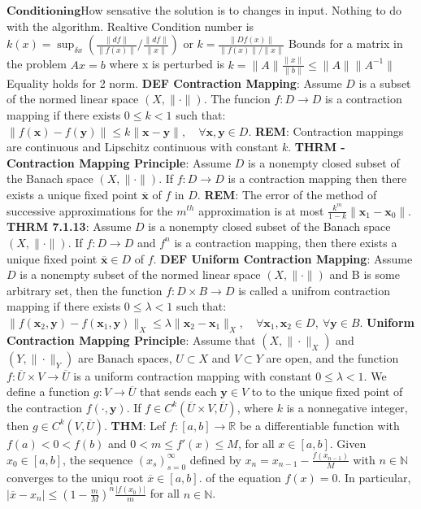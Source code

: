 \documentclass[8pt]{extarticle}
\theoremstyle{definition}
\begin{document}
$\mathbf{Conditioning}$How sensative the solution is to changes in input. Nothing to do with the algorithm.
Realtive Condition number is $k(x) = \sup_{\delta x}(\frac{\|df\|}{\|f(x)\|} \big/ \frac{\|df\|}{\|x\|})$ or $k = \frac{\|Df(x)\|}{\|f(x)\|/\|x\|}$
Bounds for a matrix in the problem $Ax = b$ where x is perturbed is $k = \|A\|\frac{\|x\|}{\|b\|} \leq \|A\|\|A^{-1}\|$ Equality holds for 2 norm.
\textbf{DEF Contraction Mapping}: Assume $D$ is a subset of the normed linear space $(X, \| \cdot \| )$. The funcion $f:D \rightarrow D$ is a contraction mapping if there exists $0 \leq k < 1$ such that: $\| f(\textbf{x}) - f(\textbf{y}) \| \leq k \| \textbf{x} - \textbf{y} \|, \quad \forall \textbf{x},\textbf{y} \in D$. 
\textbf{REM}: Contraction mappings are continuous and Lipschitz continuous with constant $k$. 
\textbf{THRM - Contraction Mapping Principle}: Assume $D$ is a nonempty closed subset of the Banach space $(X, \| \cdot \| )$. If $f:D \rightarrow D$ is a contraction mapping then there exists a unique fixed point $\overline{\textbf{x}}$ of $f$ in $D$. 
\textbf{REM}: The error of the method of successive approximations for the $m^{th}$ approximation is at most $\frac{k^m}{1-k} \| \textbf{x}_1 - \textbf{x}_0 \|$.
\textbf{THRM 7.1.13}: Assume $D$ is a nonempty closed subset of the Banach space $(X, \| \cdot \| )$. If $f:D \rightarrow D$ and $f^n$ is a contraction mapping, then there exists a unique fixed point $\overline{\textbf{x}} \in D$ of $f$. 
\textbf{DEF Uniform Contraction Mapping}: Assume $D$ is a nonempty subset of the normed linear space $(X, \| \cdot \| )$ and B is some arbitrary set, then the function $f:D \times B \rightarrow D$ is called a unifrom contraction mapping if there exists $0 \leq \lambda < 1$ such that: $\| f(\textbf{x}_2, \textbf{y}) - f(\textbf{x}_1, \textbf{y})  \|_X \leq \lambda \| \textbf{x}_2 - \textbf{x}_1 \|_X, \quad \forall \textbf{x}_1, \textbf{x}_2 \in D,~ \forall \textbf{y} \in B$. 
\textbf{Uniform Contraction Mapping Principle}: Assume that $(X, \| \cdot \|_X )$ and $(Y, \| \cdot \|_Y )$ are Banach spaces, $U\subset X$ and $V \subset Y$ are open, and the function $f:\overline U \times V \rightarrow \overline U$ is a uniform contraction mapping with constant $ 0 \leq \lambda < 1$. We define a function $g:V \rightarrow \overline U$ that sends each $\textbf{y} \in V$ to to the unique fixed point of the contraction $f(\cdot, \textbf{y})$. If $f \in C^k(\overline U \times V, \overline U)$, where $k$ is a nonnegative integer, then $g \in C^k(V,\overline U)$. 
\textbf{THM}: Lef $f:[a,b] \rightarrow \mathbb{R}$ be a differentiable function with $f(a) < 0 < f(b)$ and $0 < m \leq f'(x) \leq M$, for all $x \in [a,b]$. Given $x_0 \in [a,b]$, the sequence $(x_s)_{s=0}^{\infty}$ defined by $x_n = x_{n-1} - \frac{f(x_{n-1})}{M}$ with $n\in \mathbb{N}$ converges to the uniqu root $\overline{x} \in [a,b]$. of the equation $f(x) = 0$. In particular, $|\overline{x} - x_n| \leq \left(1-\frac{m}{M}\right)^n \frac{|f(x_0)|}{m}$ for all $n \in \mathbb{N}$.
\end{document}
